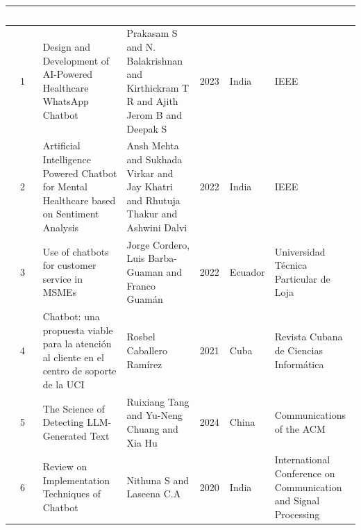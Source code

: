\begin{table}[H]
	\newcommand{\multirot}[1]{\multirow{2}{*}[-8ex]{\rotcell{\rlap{#1}}}}
	\footnotesize
	\centering
	\begin{tabular}{|m{0.5cm}|m{0.3cm}|m{4cm}|m{2cm}|m{0.6cm}|m{1.7cm}|m{3cm}|} 
		\hline
		\rowcolor[rgb]{0,0.251,0.502} \multicolumn{1}{|c|}{\textcolor{white}{Tipo}} & \multicolumn{1}{c|}{\textcolor{white}{N°}} & \multicolumn{1}{c|}{\textcolor{white}{Título}}                                                                             & \multicolumn{1}{c|}{\textcolor{white}{Autor}}        & \multicolumn{1}{c|}{\textcolor{white}{Año}} & \multicolumn{1}{c|}{\textcolor{white}{País}} & \multicolumn{1}{c|}{\textcolor{white}{Fuente}}                                                        \\ 


		\hline
		\multirot{Problema}
		& 1         
		& Design and Development of AI-Powered Healthcare WhatsApp Chatbot
		& Prakasam S and N. Balakrishnan and Kirthickram T R and Ajith Jerom B and Deepak S
		& 2023
		& India
		& IEEE \\
		\cline{2-7}

		& 2        
		& Artificial Intelligence Powered Chatbot for Mental Healthcare based on Sentiment Analysis
		& Ansh Mehta and Sukhada Virkar and Jay Khatri and Rhutuja Thakur and Ashwini Dalvi
		& 2022
		& India
		& IEEE \\

		\hline
		\multirow{3}{*}[-14ex]{\rotcell{\rlap{Propuesta}}}
		& 3        
		& Use of chatbots for customer
		service in MSMEs
		& Jorge Cordero, Luis Barba-Guaman and Franco Guamán
		& 2022
		& Ecuador
		& Universidad Técnica Particular de Loja \\
		\cline{2-7}
		& 4        
		& Chatbot: una propuesta viable para la atención al cliente en el centro de soporte de la UCI
		& Rosbel Caballero Ramírez
		& 2021
		& Cuba
		& Revista Cubana de Ciencias Informática \\
		
		\hline
		\multirow{4}{*}[-28ex]{\rotcell{\rlap{Técnica}}}
		& 5        
		& The Science of Detecting LLM-Generated Text
		& Ruixiang Tang and Yu-Neng Chuang and Xia Hu
		& 2024
		& China
		& Communications of the ACM \\ 
		\cline{2-7}

		& 6        
		& Review on Implementation Techniques of 
		Chatbot
		& Nithuna S and Laseena C.A
		& 2020
		& India
		& International Conference on Communication and Signal Processing \\ 
		\cline{2-7}


\end{tabular}
\end{table}
